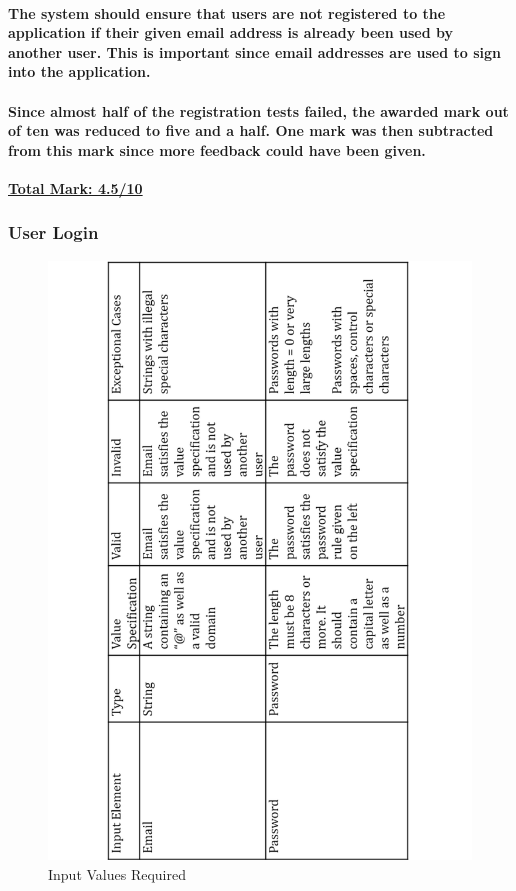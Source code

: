 \documentclass[english]{article}
\begin{document}
\paragraph{The system should ensure that users are not registered to the application if their given email address is already been used by another user. This is important since email addresses are used to sign into the application.}
\paragraph{Since almost half of the registration tests failed, the awarded mark out of ten was reduced to five and a half. One mark was then subtracted from this mark since more feedback could have been given.
\newline}
\textbf{\underline{Total Mark: 4.5/10}}
\subsubsection{User Login}

\begin{figure}[H]
\centering
\includegraphics[width=1.0\textwidth]{2.1}
\caption{Input Values Required}
\end{figure}
\end{document}
